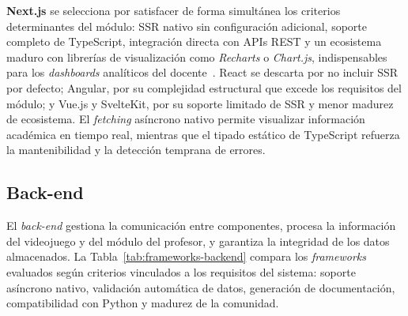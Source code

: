 \textbf{Next.js} se selecciona por satisfacer de forma simultánea los criterios determinantes del módulo: SSR nativo sin configuración adicional, soporte completo de TypeScript, integración directa con APIs REST y un ecosistema maduro con librerías de visualización como \textit{Recharts} o \textit{Chart.js}, indispensables para los \textit{dashboards} analíticos del docente~\cite{nextjs}. React se descarta por no incluir SSR por defecto; Angular, por su complejidad estructural que excede los requisitos del módulo; y Vue.js y SvelteKit, por su soporte limitado de SSR y menor madurez de ecosistema. El \textit{fetching} asíncrono nativo permite visualizar información académica en tiempo real, mientras que el tipado estático de TypeScript refuerza la mantenibilidad y la detección temprana de errores.


\subsection{Back-end}

El \textit{back-end} gestiona la comunicación entre componentes, procesa la información del videojuego y del módulo del profesor, y garantiza la integridad de los datos almacenados. La Tabla~\ref{tab:frameworks-backend} compara los \textit{frameworks} evaluados según criterios vinculados a los requisitos del sistema: soporte asíncrono nativo, validación automática de datos, generación de documentación, compatibilidad con Python y madurez de la comunidad.

